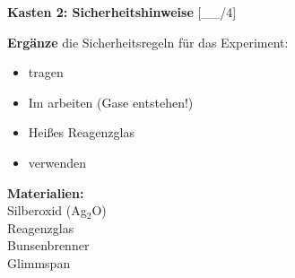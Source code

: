 \documentclass[10pt, a4paper]{article}
\newcommand{\luecke}[1]{\underline{\hspace{#1}}}
\newcommand{\punktebox}[1]{\hfill\small\textcolor{mittelgrau}{[\_\_/#1]}}
\newcommand{\operator}[1]{\textbf{\textcolor{fachfarbe}{#1}}}
\begin{document}
\begin{sicherheitsbox}
\textbf{\textcolor{warnung}{Kasten 2: Sicherheitshinweise}} \punktebox{4}\\[0.3em]
\begin{minipage}[t]{0.65\textwidth}
\operator{Ergänze} die Sicherheitsregeln für das Experiment:
\begin{itemize}[leftmargin=1.5em, itemsep=6pt]
    \item[\textcolor{warnung}{\textbf{!}}] \luecke{3cm} tragen
    \item[\textcolor{warnung}{\textbf{!}}] Im \luecke{2cm} arbeiten (Gase entstehen!)
    \item[\textcolor{warnung}{\textbf{!}}] Heißes Reagenzglas \luecke{3cm}
    \item[\textcolor{warnung}{\textbf{!}}] \luecke{3.5cm} verwenden
\end{itemize}
\end{minipage}%
\hfill
\begin{minipage}[t]{0.3\textwidth}
\centering
\textbf{Materialien:}\\
{\footnotesize
Silberoxid (Ag$_2$O)\\
Reagenzglas\\
Bunsenbrenner\\
Glimmspan
}
\end{minipage}
\end{sicherheitsbox}

\vspace{2pt}

\end{document}
